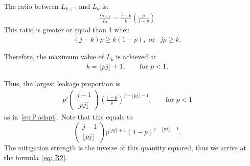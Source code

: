The ratio between $L_{k+1}$ and $L_{k}$ is:
\begin{align*}
\frac{L_{k+1}}{L_{k}}=\frac{j-k}{k}\left(\frac{p}{1-p}\right)    
\end{align*}
This ratio is greater or equal than 1 when 
\begin{align*}
(j-k)p \ge k(1-p), \mbox{ or } \ \ jp \ge k.    
\end{align*}

Therefore, the maximum value of $L_{k}$ is achieved at
\begin{align*}
    k = \lfloor pj \rfloor + 1, \qquad \mbox{for } p<1.
\end{align*}


Thus, the largest leakage proportion is 
\begin{align*}
    p^j \left(\begin{array}{c} j-1 \\ \lfloor pj \rfloor \end{array} \right) \left(\frac{1-p}{p}\right)^{j-\lfloor pj \rfloor -1}, \qquad \mbox{for } p<1
\end{align*}
as in~\eqref{eq:P.adapt}. Note that this equals to 
$$
\left(\begin{array}{c} j-1 \\ \lfloor pj \rfloor \end{array} \right) p^{\lfloor pj \rfloor+1} (1-p)^{j-\lfloor pj \rfloor -1}.
$$
The mitigation strength is the inverse of this quantity squared, thus we arrive at the formula~\eqref{eq: R2}.
